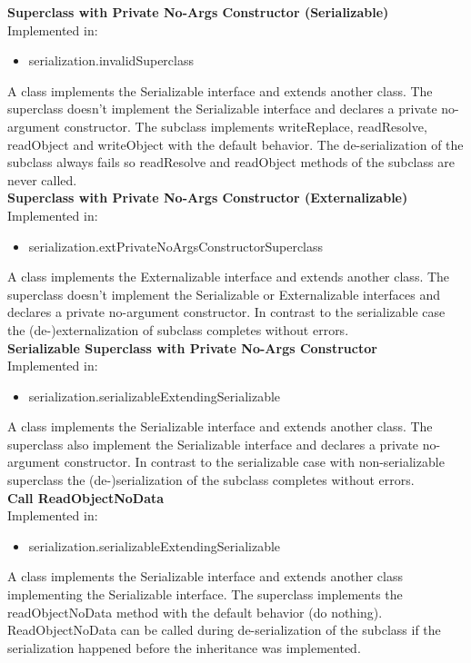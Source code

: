 \documentclass{article}
\begin{document}
\noindent
\textbf{Superclass with Private No-Args Constructor (Serializable)}\\
Implemented in: 
\begin{itemize}
    \item serialization.invalidSuperclass
\end{itemize}
A class implements the Serializable interface and extends another class. The superclass doesn't implement the Serializable interface and declares a private no-argument constructor. The subclass implements writeReplace, readResolve, readObject and writeObject with the default behavior. The de-serialization of the subclass always fails so readResolve and readObject methods of the subclass are never called.\\

\noindent
\textbf{Superclass with Private No-Args Constructor (Externalizable)}\\
Implemented in: 
\begin{itemize}
    \item serialization.extPrivateNoArgsConstructorSuperclass
\end{itemize}
A class implements the Externalizable interface and extends another class. The superclass doesn't implement the Serializable or Externalizable interfaces and declares a private no-argument constructor. In contrast to the serializable case the (de-)externalization of subclass completes without errors.\\

\noindent
\textbf{Serializable Superclass with Private No-Args Constructor}\\
Implemented in: 
\begin{itemize}
    \item serialization.serializableExtendingSerializable
\end{itemize}
A class implements the Serializable interface and extends another class. The superclass also implement the Serializable interface and declares a private no-argument constructor. In contrast to the serializable case with non-serializable superclass the (de-)serialization of the subclass completes without errors.\\

\noindent
\textbf{Call ReadObjectNoData}\\
Implemented in: 
\begin{itemize}
    \item serialization.serializableExtendingSerializable
\end{itemize}
A class implements the Serializable interface and extends another class implementing the Serializable interface. The superclass implements the readObjectNoData method with the default behavior (do nothing). ReadObjectNoData can be called during de-serialization of the subclass if the serialization happened before the inheritance was implemented.\\
\end{document}
